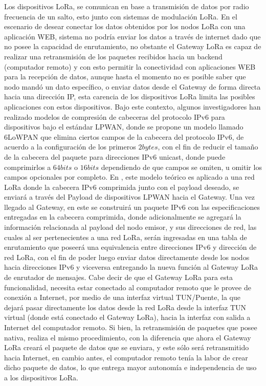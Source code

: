 \begin{justify}
Los dispositivos LoRa, se comunican en base a transmisión de datos por radio frecuencia de un salto, esto junto con sistemas de modulación LoRa. En el escenario de desear conectar los datos obtenidos por los nodos LoRa con una aplicación WEB, sistema no podría enviar los datos a través de internet dado que no posee la capacidad de enrutamiento, no obstante el Gateway LoRa es capaz de realizar una retransmisión de los paquetes recibidos hacia un backend (computador remoto) y con esto permitir la conectividad con aplicaciones WEB para la recepción de datos, aunque hasta el momento no es posible saber que nodo mandó un dato específico, o enviar datos desde el Gateway de forma directa hacia una dirección IP, esta carencia de los dispositivos LoRa limita las posibles aplicaciones con estos dispositivos. Bajo este contexto, algunos investigadores \cite{lowpan} han realizado modelos de compresión de cabeceras del protocolo IPv6 para dispositivos bajo el estándar LPWAN, donde se propone un modelo llamado 6LoWPAN que elimina ciertos campos de la cabecera del protocolo IPv6, de acuerdo a la configuración de los primeros $2bytes$, con el fin de reducir el tamaño de la cabecera del paquete para direcciones IPv6 unicast, donde puede comprimirlos a $64 bits$ o $16 bits$ dependiendo de que campos se omiten, u omitir los campos opcionales por completo. En \cite{tomas}, este modelo teórico es aplicado a una red LoRa donde la cabecera IPv6 comprimida junto con el payload deseado, se enviará a través del Payload de dispositivos LPWAN hacia el Gateway. Una vez llegado al Gateway, en este se construirá un paquete IPv6 con las especificaciones entregadas en la cabecera comprimida, donde adicionalmente se agregará la información relacionada al payload del nodo emisor, y sus direcciones de red, las cuales al ser pertenecientes a una red LoRa, serán ingresadas en una tabla de enrutamiento que poseerá una equivalencia entre direcciones IPv6 y dirección de red LoRa, con el fin de poder luego enviar datos directamente desde los nodos hacia direcciones IPv6 y viceversa entregando la nueva función al Gateway LoRa de enrutador de mensajes.\newpage
\noindent
Cabe decir de que el Gateway LoRa para esta funcionalidad, necesita estar conectado al computador remoto que le provee de conexión a Internet, por medio de una interfaz virtual TUN/Puente, la que dejará pasar directamente los datos desde la red LoRa desde la interfaz TUN virtual (donde está conectado el Gateway LoRa), hacia la interfaz con salida a Internet del computador remoto. Si bien, la retransmisión de paquetes que posee nativa, realiza el mismo procedimiento, con la diferencia que ahora el Gateway LoRa creará el paquete de datos que se enviara, y este sólo será retransmitido hacia Internet, en cambio antes, el computador remoto tenía la labor de crear dicho paquete de datos, lo que entrega mayor autonomía e independencia de uso a los dispositivos LoRa.\\

\end{justify}
